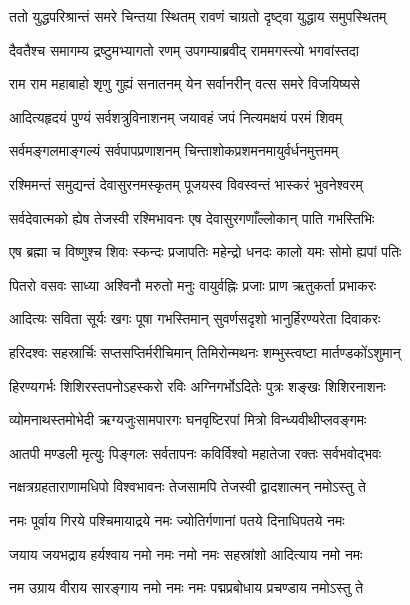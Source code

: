 
\twolineshloka
{ततो युद्धपरिश्रान्तं समरे चिन्तया स्थितम्}
{रावणं चाग्रतो दृष्ट्वा युद्धाय समुपस्थितम्} %

\twolineshloka
{दैवतैश्च समागम्य द्रष्टुमभ्यागतो रणम्}
{उपगम्याब्रवीद् राममगस्त्यो भगवांस्तदा} %

\twolineshloka
{राम राम महाबाहो शृणु गुह्यं सनातनम्}
{येन सर्वानरीन् वत्स समरे विजयिष्यसे} %

\twolineshloka
{आदित्यहृदयं पुण्यं सर्वशत्रुविनाशनम्}
{जयावहं जपं नित्यमक्षयं परमं शिवम्} %

\twolineshloka
{सर्वमङ्गलमाङ्गल्यं सर्वपापप्रणाशनम्}
{चिन्ताशोकप्रशमनमायुर्वर्धनमुत्तमम्} %

\twolineshloka
{रश्मिमन्तं समुद्यन्तं देवासुरनमस्कृतम्}
{पूजयस्व विवस्वन्तं भास्करं भुवनेश्वरम्} %

\twolineshloka
{सर्वदेवात्मको ह्येष तेजस्वी रश्मिभावनः}
{एष देवासुरगणाँल्लोकान् पाति गभस्तिभिः} %

\twolineshloka
{एष ब्रह्मा च विष्णुश्च शिवः स्कन्दः प्रजापतिः}
{महेन्द्रो धनदः कालो यमः सोमो ह्यपां पतिः} %

\twolineshloka
{पितरो वसवः साध्या अश्विनौ मरुतो मनुः}
{वायुर्वह्निः प्रजाः प्राण ऋतुकर्ता प्रभाकरः} %

\twolineshloka
{आदित्यः सविता सूर्यः खगः पूषा गभस्तिमान्}
{सुवर्णसदृशो भानुर्हिरण्यरेता दिवाकरः} %

\twolineshloka
{हरिदश्वः सहस्रार्चिः सप्तसप्तिर्मरीचिमान्}
{तिमिरोन्मथनः शम्भुस्त्वष्टा मार्तण्डकोंऽशुमान्} %

\twolineshloka
{हिरण्यगर्भः शिशिरस्तपनोऽहस्करो रविः}
{अग्निगर्भोऽदितेः पुत्रः शङ्खः शिशिरनाशनः} %

\twolineshloka
{व्योमनाथस्तमोभेदी ऋग्यजुःसामपारगः}
{घनवृष्टिरपां मित्रो विन्ध्यवीथीप्लवङ्गमः} %

\twolineshloka
{आतपी मण्डली मृत्युः पिङ्गलः सर्वतापनः}
{कविर्विश्वो महातेजा रक्तः सर्वभवोद्भवः} %

\twolineshloka
{नक्षत्रग्रहताराणामधिपो विश्वभावनः}
{तेजसामपि तेजस्वी द्वादशात्मन् नमोऽस्तु ते} %

\twolineshloka
{नमः पूर्वाय गिरये पश्चिमायाद्रये नमः}
{ज्योतिर्गणानां पतये दिनाधिपतये नमः} %

\twolineshloka
{जयाय जयभद्राय हर्यश्वाय नमो नमः}
{नमो नमः सहस्रांशो आदित्याय नमो नमः} %

\twolineshloka
{नम उग्राय वीराय सारङ्गाय नमो नमः}
{नमः पद्मप्रबोधाय प्रचण्डाय नमोऽस्तु ते} %

